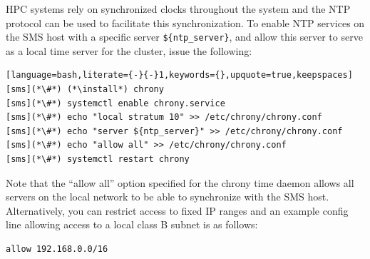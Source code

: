 HPC systems rely on synchronized clocks throughout the system and the
NTP protocol can be used to facilitate this synchronization. To enable NTP
services on the SMS host with a specific server \texttt{\$\{ntp\_server\}}, and
allow this server to serve as a local time server for the cluster,
issue the following:

\begin{lstlisting}[language=bash,literate={-}{-}1,keywords={},upquote=true,keepspaces]
[sms](*\#*) (*\install*) chrony
[sms](*\#*) systemctl enable chrony.service
[sms](*\#*) echo "local stratum 10" >> /etc/chrony/chrony.conf
[sms](*\#*) echo "server ${ntp_server}" >> /etc/chrony/chrony.conf
[sms](*\#*) echo "allow all" >> /etc/chrony/chrony.conf
[sms](*\#*) systemctl restart chrony
\end{lstlisting}

\begin{center}
\begin{tcolorbox}[]
\small Note that the ``allow all'' option specified for the chrony time daemon
allows all servers on the local network to be able to synchronize with the SMS
host. Alternatively, you can restrict access to fixed IP ranges and an example
config line allowing access to a local class B subnet is as follows:
\begin{lstlisting}[language=bash]
allow 192.168.0.0/16
\end{lstlisting}
\end{tcolorbox}
\end{center}
